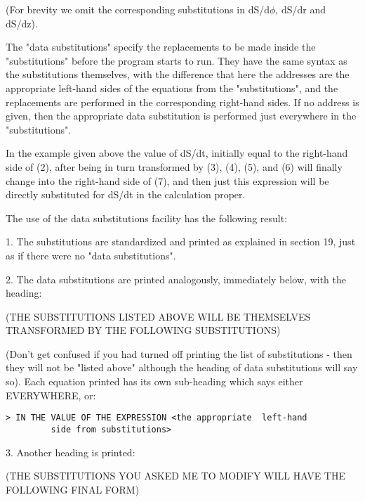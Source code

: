 \bigskip

\noindent (For brevity we  omit  the  corresponding  substitutions  in
     dS/d$\phi$, dS/dr and dS/dz).

The "data substitutions" specify the replacements  to  be
     made  inside  the "substitutions" before the program starts to
run. They have the same syntax as  the  substitutions  themselves,  with the
difference that here the addresses are the appropriate left-hand sides of the
equations from the "substitutions", and the replacements are performed in the
corresponding right-hand sides. If no address is given, then the appropriate
data substitution is performed just everywhere in the
     "substitutions".

In the example given above the value of dS/dt, initially  equal to the
right-hand side of (2), after being in turn
     transformed by (3), (4), (5), and (6)  will  finally  change
into  the right-hand side of (7), and then just this expression will be
directly substituted for dS/dt in the  calculation proper.

The use of the data substitutions facility has the following result:

1. The substitutions are standardized  and  printed  as
     explained  in section 19, just as if there were no "data substitutions".

2. The data substitutions are printed analogously,  immediately below, with the
heading:

\bigskip

(THE SUBSTITUTIONS LISTED ABOVE WILL  BE  THEMSELVES  TRANSFORMED BY THE
FOLLOWING SUBSTITUTIONS)

\bigskip

\noindent (Don't get confused if you had turned off printing the list of
substitutions - then they will not be "listed above" although the heading of
data substitutions will say so).  Each
     equation  printed  has its own sub-heading which says either
     EVERYWHERE, or:

\bigskip

\begin{verbatim}
> IN THE VALUE OF THE EXPRESSION <the appropriate  left-hand
         side from substitutions>
\end{verbatim}

\bigskip

3. Another heading is printed:

\bigskip

(THE SUBSTITUTIONS YOU ASKED ME TO MODIFY WILL HAVE THE FOLLOWING FINAL FORM)


